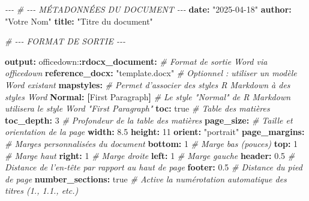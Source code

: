 \documentclass[
]{article}
\newenvironment{Shaded}{\begin{snugshade}}{\end{snugshade}}
\newcommand{\AttributeTok}[1]{\textcolor[rgb]{0.13,0.29,0.53}{#1}}
\newcommand{\CharTok}[1]{\textcolor[rgb]{0.31,0.60,0.02}{#1}}
\newcommand{\CommentTok}[1]{\textcolor[rgb]{0.56,0.35,0.01}{\textit{#1}}}
\newcommand{\DecValTok}[1]{\textcolor[rgb]{0.00,0.00,0.81}{#1}}
\newcommand{\FloatTok}[1]{\textcolor[rgb]{0.00,0.00,0.81}{#1}}
\newcommand{\FunctionTok}[1]{\textcolor[rgb]{0.13,0.29,0.53}{\textbf{#1}}}
\newcommand{\KeywordTok}[1]{\textcolor[rgb]{0.13,0.29,0.53}{\textbf{#1}}}
\newcommand{\PreprocessorTok}[1]{\textcolor[rgb]{0.56,0.35,0.01}{\textit{#1}}}
\newcommand{\StringTok}[1]{\textcolor[rgb]{0.31,0.60,0.02}{#1}}
\begin{document}
\begin{Shaded}
\begin{Highlighting}[]
\PreprocessorTok{{-}{-}{-}}
\CommentTok{\# {-}{-}{-} MÉTADONNÉES DU DOCUMENT {-}{-}{-}}
\FunctionTok{date}\KeywordTok{:}\AttributeTok{ }\StringTok{"2025{-}04{-}18"}
\FunctionTok{author}\KeywordTok{:}\AttributeTok{ }\StringTok{"Votre Nom"}
\FunctionTok{title}\KeywordTok{:}\AttributeTok{ }\StringTok{"Titre du document"}

\CommentTok{\# {-}{-}{-} FORMAT DE SORTIE {-}{-}{-}}

\FunctionTok{output}\KeywordTok{:}\AttributeTok{ }
\AttributeTok{  officedown:}\FunctionTok{:rdocx\_document}\KeywordTok{:}\CommentTok{        \# Format de sortie Word via officedown}
\AttributeTok{    }\FunctionTok{reference\_docx}\KeywordTok{:}\AttributeTok{ }\StringTok{"template.docx"}\CommentTok{  \# Optionnel : utiliser un modèle Word existant}
\AttributeTok{    }\FunctionTok{mapstyles}\KeywordTok{:}\CommentTok{                       \# Permet d’associer des styles R Markdown à des styles Word}
\AttributeTok{      }\FunctionTok{Normal}\KeywordTok{:}\AttributeTok{ }\KeywordTok{[}\StringTok{\textquotesingle{}First Paragraph\textquotesingle{}}\KeywordTok{]}\CommentTok{    \# Le style "Normal" de R Markdown utilisera le style Word "First Paragraph"}
\AttributeTok{    }\FunctionTok{toc}\KeywordTok{:}\AttributeTok{ }\CharTok{true}\CommentTok{                         \# Table des matières}
\AttributeTok{    }\FunctionTok{toc\_depth}\KeywordTok{:}\AttributeTok{ }\DecValTok{3}\CommentTok{                      \# Profondeur de la table des matières}
\AttributeTok{    }\FunctionTok{page\_size}\KeywordTok{:}\CommentTok{                        \# Taille et orientation de la page}
\AttributeTok{      }\FunctionTok{width}\KeywordTok{:}\AttributeTok{ }\FloatTok{8.5}
\AttributeTok{      }\FunctionTok{height}\KeywordTok{:}\AttributeTok{ }\DecValTok{11}
\AttributeTok{      }\FunctionTok{orient}\KeywordTok{:}\AttributeTok{ }\StringTok{"portrait"}
\AttributeTok{    }\FunctionTok{page\_margins}\KeywordTok{:}\CommentTok{                     \# Marges personnalisées du document}
\AttributeTok{      }\FunctionTok{bottom}\KeywordTok{:}\AttributeTok{ }\DecValTok{1}\CommentTok{                       \# Marge bas (pouces)}
\AttributeTok{      }\FunctionTok{top}\KeywordTok{:}\AttributeTok{ }\DecValTok{1}\CommentTok{                          \# Marge haut}
\AttributeTok{      }\FunctionTok{right}\KeywordTok{:}\AttributeTok{ }\DecValTok{1}\CommentTok{                        \# Marge droite}
\AttributeTok{      }\FunctionTok{left}\KeywordTok{:}\AttributeTok{ }\DecValTok{1}\CommentTok{                         \# Marge gauche}
\AttributeTok{      }\FunctionTok{header}\KeywordTok{:}\AttributeTok{ }\FloatTok{0.5}\CommentTok{                     \# Distance de l’en{-}tête par rapport au haut de page}
\AttributeTok{      }\FunctionTok{footer}\KeywordTok{:}\AttributeTok{ }\FloatTok{0.5}\CommentTok{                     \# Distance du pied de page}
\AttributeTok{      }\FunctionTok{number\_sections}\KeywordTok{:}\AttributeTok{ }\CharTok{true}\CommentTok{             \# Active la numérotation automatique des titres (1., 1.1., etc.)}


\end{Highlighting}
\end{Shaded}
\end{document}
